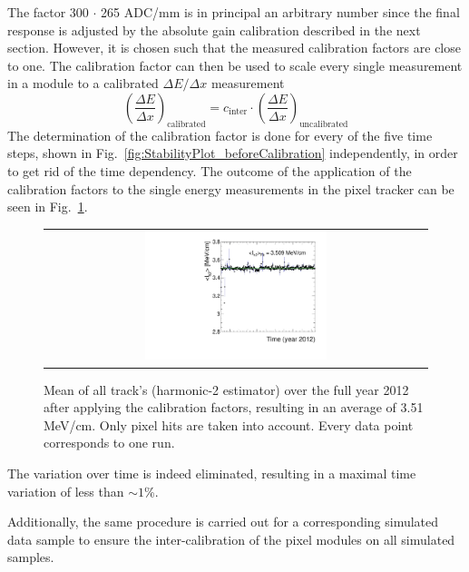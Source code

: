The factor 300 $\cdot$ 265 ADC/mm is in principal an arbitrary number since the final response is adjusted by the absolute gain calibration described in the next section.
However, it is chosen such that the measured calibration factors are close to one.
The calibration factor can then be used to scale every single measurement in a module to a calibrated $\Delta E/\Delta x$ measurement
\begin{equation}
\left( \frac{\Delta E}{\Delta x}\right)_{\text{calibrated}}=c_{\text{inter}} \cdot \left(\frac{\Delta E}{\Delta x}\right)_{\text{uncalibrated}}
\end{equation}
The determination of the calibration factor is done for every of the five time steps, shown in Fig.~\ref{fig:StabilityPlot_beforeCalibration} independently, in order to get rid of the time dependency. 
The outcome of the application of the calibration factors to the single energy measurements in the pixel tracker can be seen in Fig.~\ref{fig:StabilityPlot_afterCalibration}.
\begin{figure}[!b]
  \centering 
  \begin{tabular}{c}
  \includegraphics[width=0.49\textwidth]{figures/analysis/PixelCalibration/StabilityPlot_Pixel_afterCalibration_withoutStepFits_NEW.pdf}
  \end{tabular}
  \caption{Mean of all track's \dedx (harmonic-2 estimator) over the full year 2012 after applying the calibration factors, resulting in an average \dedx of 3.51 MeV/cm. Only pixel hits are taken into account. Every data point corresponds to one run.} 
  \label{fig:StabilityPlot_afterCalibration}
\end{figure}
The variation over time is indeed eliminated, resulting in a maximal time variation of less than $\sim1$\%.


Additionally, the same procedure is carried out for a corresponding simulated data sample to ensure the inter-calibration of the pixel modules on all simulated samples.

